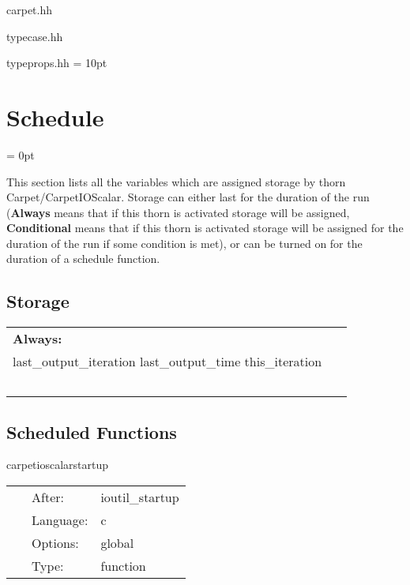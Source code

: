 carpet.hh

typecase.hh

typeprops.hh
\vspace{2mm}\parskip = 10pt 

\section{Schedule} 


\parskip = 0pt


\noindent This section lists all the variables which are assigned storage by thorn Carpet/CarpetIOScalar.  Storage can either last for the duration of the run ({\bf Always} means that if this thorn is activated storage will be assigned, {\bf Conditional} means that if this thorn is activated storage will be assigned for the duration of the run if some condition is met), or can be turned on for the duration of a schedule function.


\subsection*{Storage}

\hspace{5mm}

 \begin{tabular*}{160mm}{ll} 

{\bf Always:}&  ~ \\ 
 last\_output\_iteration last\_output\_time this\_iteration & ~\\ 
~ & ~\\ 
\end{tabular*} 


\subsection*{Scheduled Functions}
\vspace{5mm}


\hspace{5mm} carpetioscalarstartup 

\hspace{5mm}{\it startup routine } 


\hspace{5mm}

 \begin{tabular*}{160mm}{cll} 
~ & After:  & ioutil\_startup \\ 
~ & Language:  & c \\ 
~ & Options:  & global \\ 
~ & Type:  & function \\ 
\end{tabular*} 


